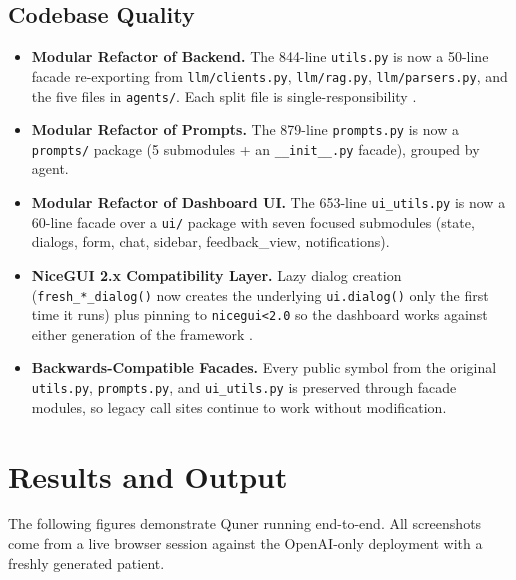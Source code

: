 \documentclass{article}
\begin{document}
\subsection{Codebase Quality}
\begin{itemize}
    \item \textbf{Modular Refactor of Backend.} The 844-line \texttt{utils.py} is now a 50-line facade re-exporting from \texttt{llm/clients.py}, \texttt{llm/rag.py}, \texttt{llm/parsers.py}, and the five files in \texttt{agents/}. Each split file is single-responsibility \cite{Cheptsov2013IntroducingAN}.

    \item \textbf{Modular Refactor of Prompts.} The 879-line \texttt{prompts.py} is now a \texttt{prompts/} package (5 submodules + an \texttt{\_\_init\_\_.py} facade), grouped by agent.

    \item \textbf{Modular Refactor of Dashboard UI.} The 653-line \texttt{ui\_utils.py} is now a 60-line facade over a \texttt{ui/} package with seven focused submodules (state, dialogs, form, chat, sidebar, feedback\_view, notifications).

    \item \textbf{NiceGUI 2.x Compatibility Layer.} Lazy dialog creation (\texttt{fresh\_*\_dialog()} now creates the underlying \texttt{ui.dialog()} only the first time it runs) plus pinning to \texttt{nicegui<2.0} so the dashboard works against either generation of the framework \cite{Rygl2017SemanticVE}.

    \item \textbf{Backwards-Compatible Facades.} Every public symbol from the original \texttt{utils.py}, \texttt{prompts.py}, and \texttt{ui\_utils.py} is preserved through facade modules, so legacy call sites continue to work without modification.
\end{itemize}

\newpage
\section{Results and Output}

The following figures demonstrate Quner running end-to-end. All screenshots come from a live browser session against the OpenAI-only deployment with a freshly generated patient.
\end{document}
